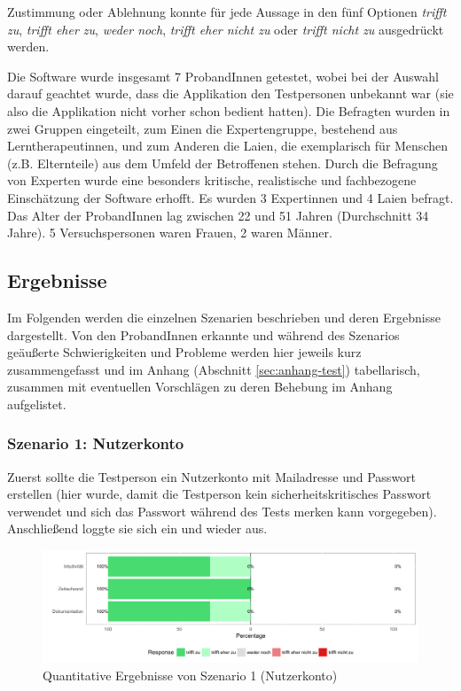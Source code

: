 Zustimmung oder Ablehnung konnte für jede Aussage in den fünf Optionen \textit{trifft zu}, \textit{trifft eher zu}, \textit{weder noch}, \textit{trifft eher nicht zu} oder \textit{trifft nicht zu} ausgedrückt werden.

Die Software wurde insgesamt 7 ProbandInnen getestet, wobei bei der Auswahl darauf geachtet wurde, dass die  Applikation den Testpersonen unbekannt war (sie also die Applikation nicht vorher schon bedient hatten). Die Befragten wurden in zwei Gruppen eingeteilt, zum Einen die Expertengruppe, bestehend aus Lerntherapeutinnen, und zum Anderen die Laien, die exemplarisch für Menschen (z.B. Elternteile) aus dem Umfeld der Betroffenen stehen. Durch die Befragung von Experten wurde eine besonders kritische, realistische und fachbezogene Einschätzung der Software erhofft. Es wurden 3 Expertinnen und 4 Laien befragt. Das Alter der ProbandInnen lag zwischen 22 und 51 Jahren (Durchschnitt 34 Jahre). 5 Versuchspersonen waren Frauen, 2 waren Männer.\\

\subsection{Ergebnisse}

Im Folgenden werden die einzelnen Szenarien beschrieben und deren Ergebnisse dargestellt. Von den ProbandInnen erkannte und während des Szenarios geäußerte Schwierigkeiten und Probleme werden hier jeweils kurz zusammengefasst und im Anhang (Abschnitt \ref{sec:anhang-test}) tabellarisch, zusammen mit eventuellen Vorschlägen zu deren Behebung im Anhang aufgelistet.

\subsubsection{Szenario 1: Nutzerkonto}

Zuerst sollte die Testperson ein Nutzerkonto mit Mailadresse und Passwort erstellen (hier wurde, damit die Testperson kein sicherheitskritisches Passwort verwendet und sich das Passwort während des Tests merken kann  vorgegeben). Anschließend loggte sie sich ein und wieder aus.

\begin{figure}[h!]
	\centering
	\includegraphics[width=.8\linewidth]{figures/evaluation/scenario1}
	\caption{Quantitative Ergebnisse von Szenario 1 (Nutzerkonto)}
	\label{fig:evaluation-sc1}
\end{figure}

